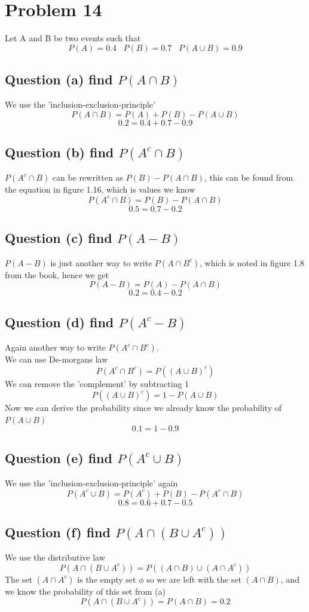 \documentclass[12pt]{article}
\begin{document}
\section*{Problem 14}
Let A and B be two events such that
\[
P(A) = 0.4 \;\;\; P(B) = 0.7 \;\;\; P(A \cup B) = 0.9 
\]

\subsection*{Question (a) find $P(A \cap B)$}
We use the 'inclusion-exclusion-principle' 
\[
P(A\cap B) = P(A) + P(B) - P(A \cup B)
\]
\[
0.2 = 0.4 + 0.7 - 0.9
\]

\subsection*{Question (b) find $P(A^c \cap B)$}
$P(A^c \cap B)$ can be rewritten as $P(B) - P(A \cap B)$, this can be found from the equation in figure 1.16, which is values we know
\[
P(A^c \cap B) = P(B) - P(A \cap B)
 \]
 \[
 0.5 = 0.7 - 0.2
 \]


\subsection*{Question (c) find $P(A -B)$}
$P(A - B)$ is just another way to write $P(A \cap B^c)$, which is noted in figure 1.8 from the book, 
hence we get
\[
P(A-B) = P(A) - P(A\cap B)
\]
\[
0.2 = 0.4 - 0.2
\]

\subsection*{Question (d) find $P(A^c - B)$}
Again another way to write $P(A^c \cap B^c)$.\\
We can use De-morgans law
\[
P(A^c \cap B^c) = P((A\cup B)^c) 
\]
We can remove the 'complement' by subtracting 1
\[
P((A\cup B)^c) = 1- P(A \cup B)
\]
Now we can derive the probability since we already know the probability of $P(A \cup B)$
\[
0.1 = 1- 0.9
\]

\subsection*{Question (e) find $P(A^c \cup B)$}
We use the 'inclusion-exclusion-principle' again
\[
P(A^c \cup B) = P(A^c) + P(B) - P(A^c \cap B)
\]
\[
0.8 = 0.6 + 0.7 - 0.5
\]





\subsection*{Question (f) find $P(A \cap(B\cup A^c))$}
We use the distributive law
\[
P(A \cap(B\cup A^c)) = P((A\cap B) \cup (A\cap A^c))
\]
The set $(A\cap A^c)$ is the empty set $\phi$ so we are left with the set $(A \cap B)$, and we know the probability of this set from (a)
\[
P(A \cap(B\cup A^c)) = P(A \cap B) = 0.2
\]











\printbibliography %
\end{document}

